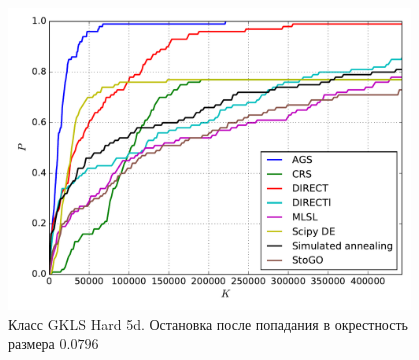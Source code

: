 \documentclass[a4paper]{article}
\begin{document}
\begin{figure}[H]
  \center
  \includegraphics[width=0.95\textwidth]{../experiments/gklsh5d_serg/cmc.pdf}
  \caption{Класс GKLS Hard 5d. Остановка после попадания в окрестность размера $0.0796$}
  \label{fig:}
\end{figure}

\end{document}
